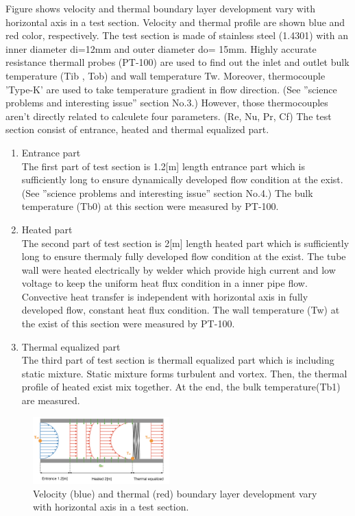 \documentclass[conference]{IEEEtran}
\begin{document}
Figure\label{thermal_boundary_layer_development} shows velocity and thermal boundary layer development vary with horizontal axis in a test section.
Velocity and thermal profile are shown blue and red color, respectively.
The test section is made of stainless steel (1.4301) with an inner diameter di=12mm and outer diameter do= 15mm.
Highly accurate resistance thermall probes (PT-100) are used to find out the inlet and outlet bulk temperature (Tib , Tob) and wall temperature Tw.
Moreover, thermocouple 'Type-K' are used to take temperature gradient in flow direction.
(See ''science problems and interesting issue'' section No.3.)
However, those thermocouples aren't directly related to calculete four parameters. (Re, Nu, Pr, Cf)
The test section consist of entrance, heated and thermal equalized part.
\begin{enumerate}
  \item Entrance part\\
  The first part of test section is 1.2[m] length entrance part which is sufficiently long to ensure dynamically developed flow condition at the exist.
  (See ''science problems and interesting issue'' section No.4.)
  The bulk temperature (Tb0) at this section were measured by PT-100.
  \item Heated part\\
  The second part of test section is 2[m] length heated part which is sufficiently long to ensure thermaly fully developed flow condition at the exist.
  The tube wall were heated electrically by welder which provide high current and low voltage to keep the uniform heat flux condition in a inner pipe flow. 
  Convective heat transfer is independent with horizontal axis in fully developed flow, constant heat flux condition.
  The wall temperature (Tw) at the exist of this section were measured by PT-100.
  \item Thermal equalized part\\
  The third part of test section is thermall equalized part which is including static mixture. Static mixture forms turbulent and vortex. Then, the thermal profile of heated exist mix together. At the end, the bulk temperature(Tb1) are measured.
\end{enumerate}


\begin{figure}[htbp]
  \centering
\includegraphics[width=0.47\textwidth,natwidth=850,natheight=450]{fig/thermal_boundary_layer_development.png}
  \caption{Velocity (blue) and thermal (red) boundary layer development vary with horizontal axis in a test section.}
  \label{thermal_boundary_layer_development}
\end{figure}
\end{document}
